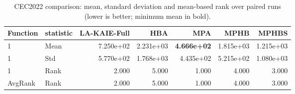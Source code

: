 \begin{table}[t]
\centering
\scriptsize
\caption{CEC2022 comparison: mean, standard deviation and mean-based rank over paired runs (lower is better; minimum mean in bold).}
\label{tab:cec2022_comparison}
\begin{tabular}{llrrrrr}
\hline
Function & statistic & LA-KAIE-Full & HBA & MPA & MPHB & MPHBS \\
\hline
1 & Mean & 7.250e+02 & 2.231e+03 & \textbf{4.666e+02} & 1.815e+03 & 1.215e+03 \\
1 & Std & 5.770e+02 & 1.768e+03 & 4.435e+02 & 5.215e+02 & 1.080e+03 \\
1 & Rank & 2.000 & 5.000 & 1.000 & 4.000 & 3.000 \\
AvgRank & Rank & 2.000 & 5.000 & 1.000 & 4.000 & 3.000 \\
\hline
\end{tabular}
\end{table}
